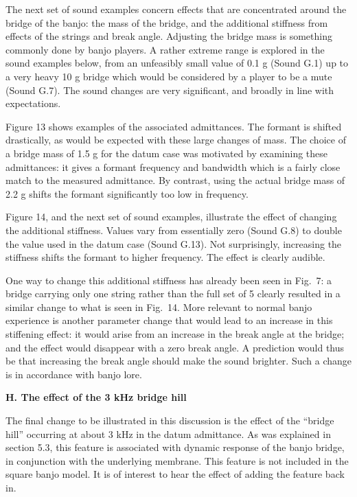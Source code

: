   The next set of sound examples concern effects that are concentrated around 
  the bridge of the banjo: the mass of the bridge, and the additional stiffness 
  from effects of the strings and break angle. Adjusting the bridge mass is 
  something commonly done by banjo players. A rather extreme range is explored 
  in the sound examples below, from an unfeasibly small value of 0.1 g (Sound 
  G.1) up to a very heavy 10 g bridge which would be considered by a player to 
  be a mute (Sound G.7). The sound changes are very significant, and broadly in 
  line with expectations. 

  Figure 13 shows examples of the associated admittances. The formant is 
  shifted drastically, as would be expected with these large changes of mass. 
  The choice of a bridge mass of 1.5 g for the datum case was motivated by 
  examining these admittances: it gives a formant frequency and bandwidth which 
  is a fairly close match to the measured admittance. By contrast, using the 
  actual bridge mass of 2.2 g shifts the formant significantly too low in 
  frequency. 

  Figure 14, and the next set of sound examples, illustrate the effect of 
  changing the additional stiffness. Values vary from essentially zero (Sound 
  G.8) to double the value used in the datum case (Sound G.13). Not 
  surprisingly, increasing the stiffness shifts the formant to higher 
  frequency. The effect is clearly audible. 

  One way to change this additional stiffness has already been seen in Fig.\ 7: 
  a bridge carrying only one string rather than the full set of 5 clearly 
  resulted in a similar change to what is seen in Fig.\ 14. More relevant to 
  normal banjo experience is another parameter change that would lead to an 
  increase in this stiffening effect: it would arise from an increase in the 
  break angle at the bridge; and the effect would disappear with a zero break 
  angle. A prediction would thus be that increasing the break angle should make 
  the sound brighter. Such a change is in accordance with banjo lore. 

  \textbf{H. The effect of the 3 kHz bridge hill} 

  The final change to be illustrated in this discussion is the effect of the 
  ``bridge hill'' occurring at about 3 kHz in the datum admittance. As was 
  explained in section 5.3, this feature is associated with dynamic response of 
  the banjo bridge, in conjunction with the underlying membrane. This feature 
  is not included in the square banjo model. It is of interest to hear the 
  effect of adding the feature back in. 

